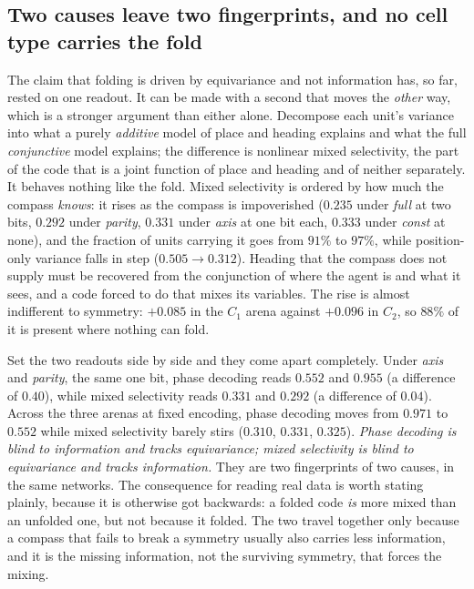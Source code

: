 \subsection*{Two causes leave two fingerprints, and no cell type carries the fold}

The claim that folding is driven by equivariance and not information has, so far, rested on one readout.
It can be made with a second that moves the \emph{other} way, which is a stronger argument than either
alone. Decompose each unit's variance into what a purely \emph{additive} model of place and heading
explains and what the full \emph{conjunctive} model explains; the difference is nonlinear mixed
selectivity, the part of the code that is a joint function of place and heading and of neither
separately. It behaves nothing like the fold. Mixed selectivity is ordered by how much the compass
\emph{knows}: it rises as the compass is impoverished ($0.235$ under \textit{full} at two bits,
$0.292$ under \textit{parity}, $0.331$ under \textit{axis} at one bit each, $0.333$ under \textit{const}
at none), and the fraction of units carrying it goes from $91\%$ to $97\%$, while position-only variance
falls in step ($0.505 \to 0.312$). Heading that the compass does not supply must be recovered from
the conjunction of where the agent is and what it sees, and a code forced to do that mixes its variables.
The rise is almost indifferent to symmetry: $+0.085$ in the $C_1$ arena against $+0.096$ in
$C_2$, so $88\%$ of it is present where nothing can fold.

Set the two readouts side by side and they come apart completely. Under \textit{axis} and
\textit{parity}, the same one bit, phase decoding reads $0.552$ and $0.955$ (a difference of
$0.40$), while mixed selectivity reads $0.331$ and $0.292$ (a difference of $0.04$). Across the three
arenas at fixed encoding, phase decoding moves from $0.971$ to $0.552$ while mixed selectivity barely
stirs ($0.310$, $0.331$, $0.325$). \emph{Phase decoding is blind to information and tracks equivariance;
mixed selectivity is blind to equivariance and tracks information.} They are two fingerprints of two
causes, in the same networks. The consequence for reading real data is worth stating plainly, because it
is otherwise got backwards: a folded code \emph{is} more mixed than an unfolded one, but not because it
folded. The two travel together only because a compass that fails to break a symmetry usually also
carries less information, and it is the missing information, not the surviving symmetry, that forces the
mixing.


